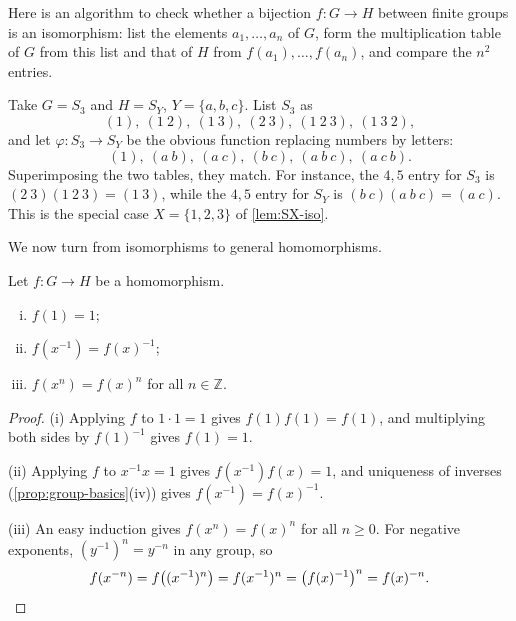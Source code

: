\begin{eg}[\(S_3\) and \(S_Y\)]\label{eg:S3-SY}
	Here is an algorithm to check whether a bijection \(f\colon G \to H\) between finite
	groups is an isomorphism: list the elements \(a_1, \dots, a_n\) of \(G\), form the
	multiplication table of \(G\) from this list and that of \(H\) from
	\(f(a_1), \dots, f(a_n)\), and compare the \(n^2\) entries.

	Take \(G = S_3\) and \(H = S_Y\), \(Y = \{a,b,c\}\). List \(S_3\) as
	\[
		(1),\ (1\ 2),\ (1\ 3),\ (2\ 3),\ (1\ 2\ 3),\ (1\ 3\ 2),
	\]
	and let \(\varphi\colon S_3 \to S_Y\) be the obvious function replacing numbers by
	letters:
	\[
		(1),\ (a\ b),\ (a\ c),\ (b\ c),\ (a\ b\ c),\ (a\ c\ b).
	\]
	Superimposing the two tables, they match. For instance, the \(4,5\) entry for \(S_3\) is
	\((2\ 3)(1\ 2\ 3) = (1\ 3)\), while the \(4,5\) entry for \(S_Y\) is
	\((b\ c)(a\ b\ c) = (a\ c)\). This is the special case \(X = \{1,2,3\}\) of
	\autoref{lem:SX-iso}.
\end{eg}

We now turn from isomorphisms to general homomorphisms.

\begin{lemma}\label{lem:hom-basics}
	Let \(f\colon G \to H\) be a homomorphism.
	\begin{enumerate}[(i)]
		\item \(f(1) = 1\);
		\item \(f(x^{-1}) = f(x)^{-1}\);
		\item \(f(x^n) = f(x)^n\) for all \(n \in \mathbb Z\).
	\end{enumerate}
\end{lemma}

\begin{proof}
	(i) Applying \(f\) to \(1 \cdot 1 = 1\) gives \(f(1)f(1) = f(1)\), and multiplying both
	sides by \(f(1)^{-1}\) gives \(f(1) = 1\).

	(ii) Applying \(f\) to \(x^{-1}x = 1\) gives \(f(x^{-1})f(x) = 1\), and uniqueness of
	inverses (\autoref{prop:group-basics}(iv)) gives \(f(x^{-1}) = f(x)^{-1}\).

	(iii) An easy induction gives \(f(x^n) = f(x)^n\) for all \(n \geq 0\). For negative
	exponents, \((y^{-1})^n = y^{-n}\) in any group, so
	\[
		f(x^{-n}) = f\bigl((x^{-1})^n\bigr) = f(x^{-1})^n = \bigl(f(x)^{-1}\bigr)^n
		= f(x)^{-n}. \qedhere
	\]
\end{proof}

